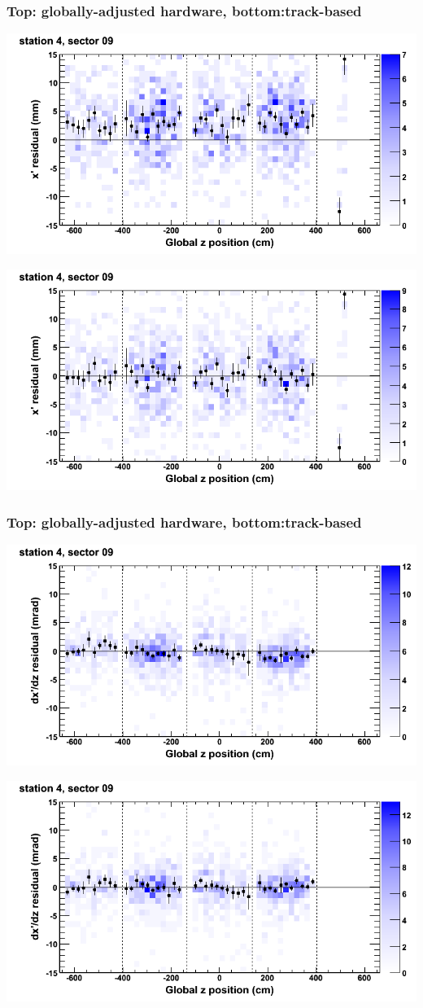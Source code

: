 \documentclass[compress]{beamer}
\begin{document}
\begin{frame}
\frametitle{Top: globally-adjusted hardware, bottom:track-based}
\includegraphics[width=0.7\linewidth]{NOV4_mapplots_HW/DTvsz_st4sec09_x.png}

\includegraphics[width=0.7\linewidth]{NOV4_mapplots/DTvsz_st4sec09_x.png}
\end{frame}

\begin{frame}
\frametitle{Top: globally-adjusted hardware, bottom:track-based}
\includegraphics[width=0.7\linewidth]{NOV4_mapplots_HW/DTvsz_st4sec09_dxdz.png}

\includegraphics[width=0.7\linewidth]{NOV4_mapplots/DTvsz_st4sec09_dxdz.png}
\end{frame}
\end{document}
